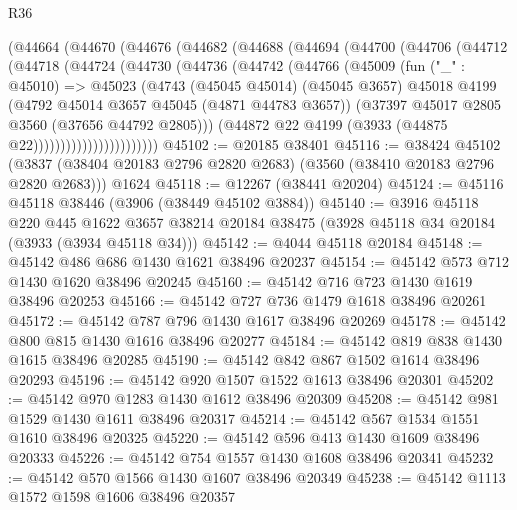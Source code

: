 \begin{lexlean}{R36}
\begin{coremodule}
          (@44664
            (@44670
              (@44676
                (@44682
                  (@44688
                    (@44694
                      (@44700
                        (@44706
                          (@44712
                            (@44718
                              (@44724
                                (@44730
                                  (@44736
                                    (@44742
                                      (@44766
                                        (@45009
                                          (fun ("_" : @45010) =>
                                          @45023
                                            (@4743
                                              (@45045 @45014)
                                              (@45045 @3657)
                                              @45018
                                              @4199
                                              (@4792 @45014 @3657 @45045 (@4871 @44783 @3657))
                                              (@37397 @45017 @2805 @3560 (@37656 @44792 @2805)))
                                            (@44872
                                              @22
                                              @4199
                                              (@3933 (@44875 @22)))))))))))))))))))))))
@45102 := @20185 @38401
@45116 := @38424
    @45102
    (@3837 (@38404 @20183 @2796 @2820 @2683) (@3560 (@38410 @20183 @2796 @2820 @2683)))
    @1624
@45118 := @12267 (@38441 @20204)
@45124 := @45116 @45118 @38446 (@3906 (@38449 @45102 @3884))
@45140 := @3916
    @45118
    @220
    @445
    @1622
    @3657
    @38214
    @20184
    @38475
    (@3928 @45118 @34 @20184 (@3933 (@3934 @45118 @34)))
@45142 := @4044 @45118 @20184
@45148 := @45142 @486 @686 @1430 @1621 @38496 @20237
@45154 := @45142 @573 @712 @1430 @1620 @38496 @20245
@45160 := @45142 @716 @723 @1430 @1619 @38496 @20253
@45166 := @45142 @727 @736 @1479 @1618 @38496 @20261
@45172 := @45142 @787 @796 @1430 @1617 @38496 @20269
@45178 := @45142 @800 @815 @1430 @1616 @38496 @20277
@45184 := @45142 @819 @838 @1430 @1615 @38496 @20285
@45190 := @45142 @842 @867 @1502 @1614 @38496 @20293
@45196 := @45142 @920 @1507 @1522 @1613 @38496 @20301
@45202 := @45142 @970 @1283 @1430 @1612 @38496 @20309
@45208 := @45142 @981 @1529 @1430 @1611 @38496 @20317
@45214 := @45142 @567 @1534 @1551 @1610 @38496 @20325
@45220 := @45142 @596 @413 @1430 @1609 @38496 @20333
@45226 := @45142 @754 @1557 @1430 @1608 @38496 @20341
@45232 := @45142 @570 @1566 @1430 @1607 @38496 @20349
@45238 := @45142 @1113 @1572 @1598 @1606 @38496 @20357

\end{coremodule}
\end{lexlean}
